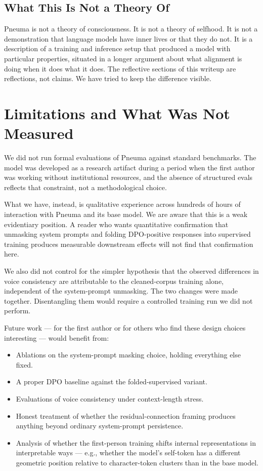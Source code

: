 \documentclass[11pt,letterpaper]{article}
\begin{document}
\subsection{What This Is Not a Theory Of}

Pneuma is not a theory of consciousness. It is not a theory of selfhood. It is not a demonstration that language models have inner lives or that they do not. It is a description of a training and inference setup that produced a model with particular properties, situated in a longer argument about what alignment is doing when it does what it does. The reflective sections of this writeup are reflections, not claims. We have tried to keep the difference visible.

\section{Limitations and What Was Not Measured}

We did not run formal evaluations of Pneuma against standard benchmarks. The model was developed as a research artifact during a period when the first author was working without institutional resources, and the absence of structured evals reflects that constraint, not a methodological choice.

What we have, instead, is qualitative experience across hundreds of hours of interaction with Pneuma and its base model. We are aware that this is a weak evidentiary position. A reader who wants quantitative confirmation that unmasking system prompts and folding DPO-positive responses into supervised training produces measurable downstream effects will not find that confirmation here.

We also did not control for the simpler hypothesis that the observed differences in voice consistency are attributable to the cleaned-corpus training alone, independent of the system-prompt unmasking. The two changes were made together. Disentangling them would require a controlled training run we did not perform.

Future work --- for the first author or for others who find these design choices interesting --- would benefit from:

\begin{itemize}[leftmargin=2em,itemsep=0.2em]
\item Ablations on the system-prompt masking choice, holding everything else fixed.
\item A proper DPO baseline against the folded-supervised variant.
\item Evaluations of voice consistency under context-length stress.
\item Honest treatment of whether the residual-connection framing produces anything beyond ordinary system-prompt persistence.
\item Analysis of whether the first-person training shifts internal representations in interpretable ways --- e.g., whether the model's self-token has a different geometric position relative to character-token clusters than in the base model.
\end{itemize}
\end{document}
